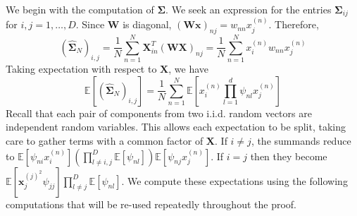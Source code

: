             We begin with the computation of $\mathbf{\Sigma}$. We seek an expression for the entries $\mathbf{\Sigma}_{ij}$ for $i,j=1,\ldots,D$. Since $\mathbf{W}$ is diagonal, $(\mathbf{W}\mathbf{x})_{nj} = w_{nn}x^{(n)}_j$. Therefore,
            \begin{equation*}
                (\hat{\mathbf{\Sigma}}_N)_{i,j}  = \frac{1}{N} \sum_{n=1}^N \mathbf{X}^T_{in}(\mathbf{W}\mathbf{X})_{nj} = \frac{1}{N}\sum_{n=1}^N x^{(n)}_i w_{nn} x^{(n)}_j 
            \end{equation*}
            Taking expectation with respect to $\mathbf{X}$, we have
            \begin{equation*}
                \mathds{E}[(\hat{\mathbf{\Sigma}}_N)_{i,j}] = \frac{1}{N}\sum_{n=1}^N \mathds{E}[x^{(n)}_i\prod_{l=1}^d \psi_{nl} x^{(n)}_j]
            \end{equation*}
            Recall that each pair of components from two i.i.d. random vectors are independent random variables. This allows each expectation to be split, taking care to gather terms with a common factor of $\mathbf{X}$. 
            If $i\neq j$, the summands reduce to $\mathds{E}[\psi_{ni}x^{(n)}_i] (\prod_{l\neq i,j}^D \mathds{E}[\psi_{nl}]) \mathds{E}[\psi_{nj}x^{(n)}_j]$. If $i=j$ then they become $\mathds{E}[\mathbf{x}^{{(j)}^2}_j \psi_{jj}] \prod_{l\neq j}^D \mathds{E}[\psi_{nl}]$. We compute these expectations using the following computations that will be re-used repeatedly throughout the proof.

